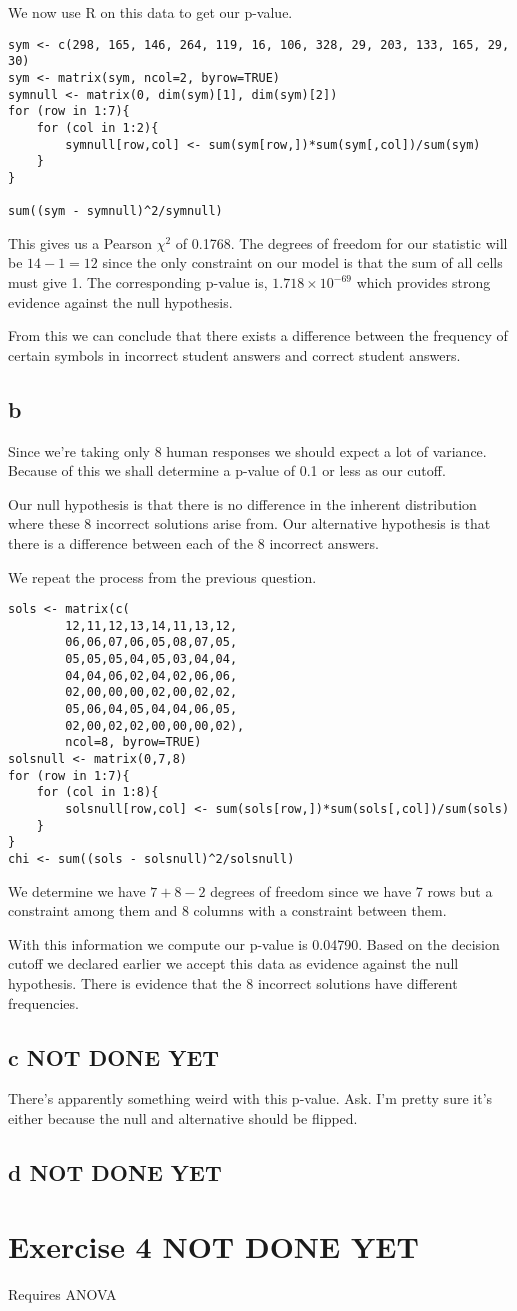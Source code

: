 \documentclass{article}
\begin{document}
We now use R on this data to get our p-value.
\begin{verbatim}
sym <- c(298, 165, 146, 264, 119, 16, 106, 328, 29, 203, 133, 165, 29, 30)
sym <- matrix(sym, ncol=2, byrow=TRUE)
symnull <- matrix(0, dim(sym)[1], dim(sym)[2])
for (row in 1:7){
    for (col in 1:2){
        symnull[row,col] <- sum(sym[row,])*sum(sym[,col])/sum(sym)
    }
}

sum((sym - symnull)^2/symnull)
\end{verbatim}

This gives us a Pearson $\chi^2$ of 0.1768. The degrees of freedom for our
statistic will be $14-1 = 12$ since the only constraint on our model is that
the sum of all cells must give 1.
The corresponding p-value is, $1.718 \times 10^{-69}$ which provides strong
evidence against the null hypothesis.

From this we can conclude that there exists a difference between the frequency
of certain symbols in incorrect student answers and correct student answers.

\subsection{b}
Since we're taking only 8 human responses we should expect a lot of variance.
Because of this we shall determine a p-value of 0.1 or less as our cutoff.

Our null hypothesis is that there is no difference in the inherent distribution
where these 8 incorrect solutions arise from. Our alternative hypothesis is that
there is a difference between each of the 8 incorrect answers.

We repeat the process from the previous question.
\begin{verbatim}
sols <- matrix(c(
        12,11,12,13,14,11,13,12,
        06,06,07,06,05,08,07,05,
        05,05,05,04,05,03,04,04,
        04,04,06,02,04,02,06,06,
        02,00,00,00,02,00,02,02,
        05,06,04,05,04,04,06,05,
        02,00,02,02,00,00,00,02),
        ncol=8, byrow=TRUE)
solsnull <- matrix(0,7,8)
for (row in 1:7){
    for (col in 1:8){
        solsnull[row,col] <- sum(sols[row,])*sum(sols[,col])/sum(sols)
    }
}
chi <- sum((sols - solsnull)^2/solsnull)
\end{verbatim}

We determine we have $7 + 8 - 2$ degrees of freedom since we have 7 rows but a 
constraint among them and 8 columns with a constraint between them.

With this information we compute our p-value is 0.04790.
Based on the decision cutoff we declared earlier we accept this data as evidence
against the null hypothesis. There is evidence that the 8 incorrect solutions
have different frequencies.

\subsection{c NOT DONE YET}
There's apparently something weird with this p-value. Ask.
I'm pretty sure it's either because the null and alternative should be flipped.

\subsection{d NOT DONE YET}

\section{Exercise 4 NOT DONE YET}
Requires ANOVA
\end{document}
